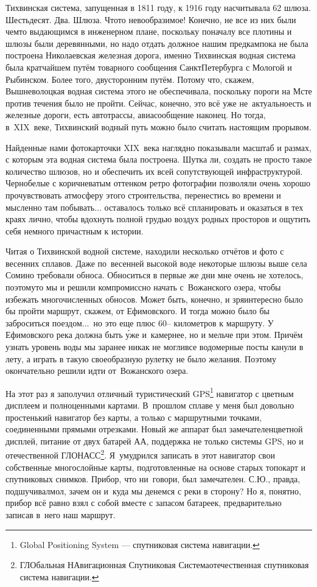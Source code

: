 \newpage
Тихвинская система, запущенная в 1811 году, к 1916 году насчитывала 62 шлюза. Шестьдесят. Два. Шлюза. Что\sdash то невообразимое! Конечно, не все из них были чем\sdash то выдающимся в инженерном плане, поскольку поначалу все плотины и шлюзы были деревянными, но надо отдать должное нашим предкам\mdash пока не была построена Николаевская железная дорога, именно Тихвинская водная система была кратчайшем путём товарного сообщения Санкт\sdash Петербурга с Мологой и Рыбинском. Более того, двусторонним путём. Потому что, скажем, Вышневолоцкая водная система этого не обеспечивала, поскольку пороги на Мсте против течения было не пройти. Сейчас, конечно, это всё уже не~актуально\mdash есть и железные дороги, есть автотрассы, авиасообщение наконец. Но тогда, в~XIX~веке, Тихвинский водный путь можно было считать настоящим прорывом. 

Найденные нами фотокарточки XIX~века наглядно показывали масштаб и размах, с которым эта водная система была построена. Шутка ли, создать не просто такое количество шлюзов, но и обеспечить их всей сопутствующей инфраструктурой. Черно\sdash белые с коричневатым оттенком ретро фотографии позволяли очень хорошо прочувствовать атмосферу этого строительства, перенестись во времени и мысленно там побывать$\ldots$ оставалось только всё спланировать и оказаться в тех краях лично, чтобы вдохнуть полной грудью воздух родных просторов и ощутить себя немного причастным к истории.

Читая о Тихвинской водной системе, находили несколько отчётов и фото с весенних сплавов. Даже по~весенней высокой воде некоторые шлюзы выше села Сомино требовали обноса. Обноситься в первые же дни мне очень не хотелось, поэтому\sdash то мы и решили компромиссно начать с~Вожанского озера, чтобы избежать многочисленных обносов. Может быть, конечно, и зря\mdash интересно было бы пройти маршрут, скажем, от Ефимовского. И тогда можно было бы заброситься поездом$\ldots$~но это еще плюс 60\thinspace\nobreakdash-- километров к маршруту. У Ефимовского река должна быть \'{у}же и~камернее, но и мельче при этом. Причём узнать уровень воды мы заранее никак не могли\mdash все водомерные посты канули в лету, а играть в такую своеобразную рулетку не было желания. Поэтому окончательно решили идти от~Вожанского озера. 

\renewcommand*{\thefootnote}{\arabic{footnote}}
На этот раз я заполучил отличный туристический GPS\footnote[1]{Global Positioning System --- спутниковая система навигации.} навигатор с цветным дисплеем и полноценными картами. В~прошлом сплаве у меня был довольно простенький навигатор без карты, а только с маршрутными точками, соединенными прямыми отрезками. Новый же аппарат был замечателен\mdash цветной дисплей, питание от двух батарей АА, поддержка не только системы GPS, но и отечественной ГЛОНАСС\footnote[2]{ГЛОбальная НАвигационная Спутниковая Система\mdash отечественная спутниковая система навигации.}. Я~умудрился записать в этот навигатор свои собственные многослойные карты, подготовленные на основе старых топокарт и спутниковых снимков. Прибор, что ни~говори, был замечателен. С.Ю., правда, подшучивал\mdash мол, зачем он и~куда мы денемся с реки в сторону? Но я, понятно, прибор всё равно взял с собой вместе с запасом батареек, предварительно записав в~него наш маршрут.

